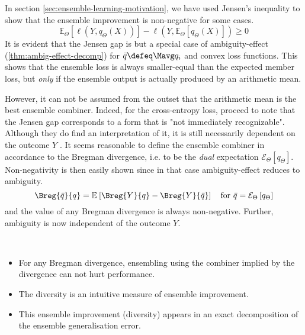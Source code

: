 \documentclass[../main.tex]{subfiles}
\begin{document}
In section \ref{sec:ensemble-learning-motivation}, we have used Jensen's inequality to show that the ensemble improvement is non-negative for some cases.
$$
\mathbb{E}_{{\Theta}}\left[ \ell (Y, q_{\Theta}(X)) \right]  -
\ell(Y, \mathbb{E}_{\Theta}\left[ q_{\Theta}(X) \right]) \geq 0
$$
It is evident that the Jensen gap is but a special case of ambiguity-effect (\cf \ref{thm:ambig-effect-decomp}) for $\bar{q} \defeq \Mavg q_{i}$ and convex loss functions. 
This shows that the ensemble loss is always smaller-equal than the expected member loss, but \textit{only} if the ensemble output is actually produced by an arithmetic mean. 

However, it can not be assumed from the outset that the arithmetic mean is the best ensemble combiner. Indeed, for the cross-entropy loss, \citeauthor{abe_PathologiesPredictiveDiversity_2023} \cite{abe_PathologiesPredictiveDiversity_2023} proceed to note that the Jensen gap corresponds to a form that is "not immediately recognizable". Although they do find an interpretation of it, it is still necessarily dependent on the outcome $Y$ 
.
It seems reasonable to define the ensemble combiner in accordance to the Bregman divergence, i.e. to be the \textit{dual} expectation $\mathcal{E}_{\Theta}\left[ q_{\Theta} \right]$. 
Non-negativity is then easily shown since in that case ambiguity-effect reduces to ambiguity.
$$
\Breg{\bar{q}}{q} = \mathbb{E}_{}\left[ \Breg{Y}{q} - \Breg{Y}{\bar{q}} \right]
\hspace{1em} \text{for $\bar{q} = \mathcal{E}_\Theta\left[q_\Theta\right]$}
$$ and the value of any Bregman divergence is always non-negative. Further, ambiguity is now independent of the outcome $Y$.

\begin{corollary} ~ ~ 
    \label{cor:bregman-divergences}
    \begin{itemize}
        \item For any Bregman divergence, ensembling using the combiner implied by the divergence can not hurt performance.
        \item The diversity is an intuitive measure of ensemble improvement.
        \item This ensemble improvement (diversity) appears in an exact decomposition of the ensemble generalisation error.
    \end{itemize}
\end{corollary}


\end{document}

